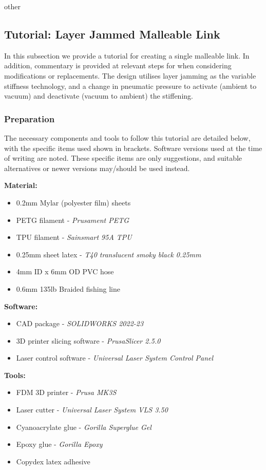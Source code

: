 other
%

\subsection{Tutorial: Layer Jammed Malleable Link}
In this subsection we provide a tutorial for creating a single malleable link. In addition, commentary is provided at relevant steps for when considering modifications or replacements. The design utilises layer jamming as the variable stiffness technology, and a change in pneumatic pressure to activate (ambient to vacuum) and deactivate (vacuum to ambient) the stiffening.

\subsubsection{Preparation}
The necessary components and tools to follow this tutorial are detailed below, with the specific items used shown in brackets. Software versions used at the time of writing are noted. These specific items are only suggestions, and suitable alternatives or newer versions may/should be used instead.

\textbf{Material:}
\begin{itemize}
    \item 0.2mm Mylar \textsuperscript{\textregistered} (polyester film) sheets
    \item PETG filament - \textit{Prusament PETG}
    \item TPU filament - \textit{Sainsmart 95A TPU}
    \item 0.25mm sheet latex - \textit{T40 translucent smoky black 0.25mm}
    \item 4mm ID x 6mm OD PVC hose
    \item 0.6mm 135lb Braided fishing line
\end{itemize}
\textbf{Software:}
\begin{itemize}
    \item CAD package - \textit{SOLIDWORKS 2022-23}
    \item 3D printer slicing software - \textit{PrusaSlicer 2.5.0}
    \item Laser control software - \textit{Universal Laser System Control Panel}
\end{itemize}
\textbf{Tools:}
\begin{itemize}
    \item FDM 3D printer - \textit{Prusa MK3S}
    \item Laser cutter - \textit{Universal Laser System VLS 3.50}
    \item Cyanoacrylate glue - \textit{Gorilla Superglue Gel}
    \item Epoxy glue - \textit{Gorilla Epoxy}
    \item Copydex latex adhesive
\end{itemize}

